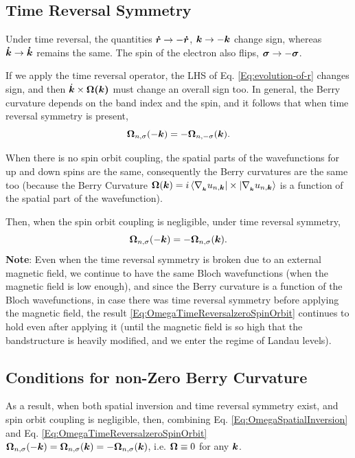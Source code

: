 \documentclass{report}
\renewcommand\vec[1]{\ensuremath\boldsymbol{#1}} %
\begin{document}
\subsection{Time Reversal Symmetry}
Under time reversal, the quantities $\vec{\dot{r}} \rightarrow -\vec{\dot{r}}$, $\vec{k} \rightarrow -\vec{k}$ change sign, whereas $\vec{\dot{k}} \rightarrow \vec{\dot{k}}$ remains the same. The spin of the electron also flips, $\vec{\sigma} \rightarrow -\vec{\sigma}$.

If we apply the time reversal operator, the LHS of Eq. \eqref{Eq:evolution-of-r} changes sign, and then $\dot{\vec{k}}\times \vec{\Omega(\vec{k})}$ must change an overall sign too. In general, the Berry curvature depends on the band index and the spin, and it follows that when time reversal symmetry is present,
\begin{equation}\label{Eq:OmegaTimeReversal}
	\vec{\Omega}_{n,\sigma}(-\vec{k}) = -\vec{\Omega}_{n,-\sigma}(\vec{k}).
\end{equation}

When there is no spin orbit coupling, the spatial parts of the wavefunctions for up and down spins are the same, consequently the Berry curvatures are the same too (because the Berry Curvature $\vec{\Omega}(\vec{k}) = i \bra{\nabla_{_{\vec{k}}} u_{n,\vec{k}}}\times \ket{\nabla_{_{\vec{k}}} u_{n,\vec{k}}}$ is a function of the spatial part of the wavefunction).

Then, when the spin orbit coupling is negligible, under time reversal symmetry,
\begin{equation}\label{Eq:OmegaTimeReversalzeroSpinOrbit}
	\vec{\Omega}_{n,\sigma}(-\vec{k}) = -\vec{\Omega}_{n,\sigma}(\vec{k}).
\end{equation}
\textbf{Note}: Even when the time reversal symmetry is broken due to an external magnetic field, we continue to have the same Bloch wavefunctions (when the magnetic field is low enough), and since the Berry curvature is a function of the Bloch wavefunctions, in case there was time reversal symmetry before applying the magnetic field, the result \eqref{Eq:OmegaTimeReversalzeroSpinOrbit} continues to hold even after applying it (until the magnetic field is so high that the bandstructure is heavily modified, and we enter the regime of Landau levels).

\subsection{Conditions for non-Zero Berry Curvature}
As a result, when both spatial inversion and time reversal symmetry exist, and spin orbit coupling is negligible, then, combining Eq. \eqref{Eq:OmegaSpatialInversion} and Eq. \eqref{Eq:OmegaTimeReversalzeroSpinOrbit} $\vec{\Omega}_{n,\sigma}(-\vec{k}) = \vec{\Omega}_{n,\sigma}(\vec{k}) = -\vec{\Omega}_{n,\sigma}(\vec{k})$, i.e. $\vec{\Omega} \equiv 0$ for any $\vec{k}$.
\end{document}

